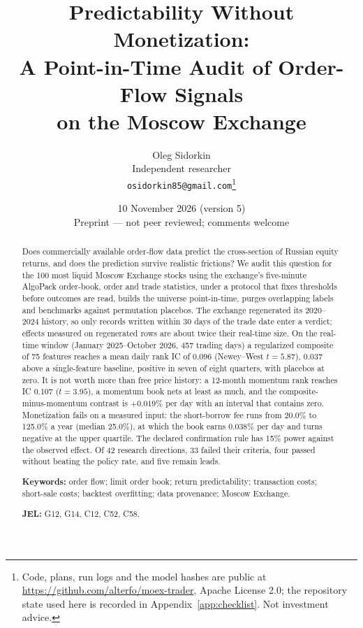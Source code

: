 \documentclass[11pt]{article}
\title{\textbf{Predictability Without Monetization:\\
A Point-in-Time Audit of Order-Flow Signals\\
on the Moscow Exchange}}
\author{Oleg Sidorkin\\[3pt]\small Independent researcher\\[1pt]\small\texttt{osidorkin85@gmail.com}\thanks{Code, plans, run logs and the model hashes are public at \url{https://github.com/alterfo/moex-trader}, Apache License 2.0; the repository state used here is recorded in Appendix~\ref{app:checklist}. Not investment advice.}}
\date{10 November 2026 \quad (version 5)\\[4pt]\small Preprint --- not peer reviewed; comments welcome}
\begin{document}
\maketitle

\begin{abstract}
\noindent
Does commercially available order-flow data predict the cross-section of Russian equity returns, and does the prediction survive realistic frictions? We audit this question for the 100 most liquid Moscow Exchange stocks using the exchange's five-minute AlgoPack order-book, order and trade statistics, under a protocol that fixes thresholds before outcomes are read, builds the universe point-in-time, purges overlapping labels and benchmarks against permutation placebos. The exchange regenerated its 2020--2024 history, so only records written within 30 days of the trade date enter a verdict; effects measured on regenerated rows are about twice their real-time size. On the real-time window (January 2025--October 2026, 457 trading days) a regularized composite of 75 features reaches a mean daily rank IC of 0.096 (Newey--West $t=5.87$), 0.037 above a single-feature baseline, positive in seven of eight quarters, with placebos at zero. It is not worth more than free price history: a 12-month momentum rank reaches IC 0.107 ($t=3.95$), a momentum book nets at least as much, and the composite-minus-momentum contrast is $+0.019$\% per day with an interval that contains zero. Monetization fails on a measured input: the short-borrow fee runs from 20.0\% to 125.0\% a year (median 25.0\%), at which the book earns 0.038\% per day and turns negative at the upper quartile. The declared confirmation rule has 15\% power against the observed effect. Of 42 research directions, 33 failed their criteria, four passed without beating the policy rate, and five remain leads.

\medskip
\noindent\textbf{Keywords:} order flow; limit order book; return predictability; transaction costs; short-sale costs; backtest overfitting; data provenance; Moscow Exchange.

\noindent\textbf{JEL:} G12, G14, C12, C52, C58.
\end{abstract}

\newpage














\end{document}
